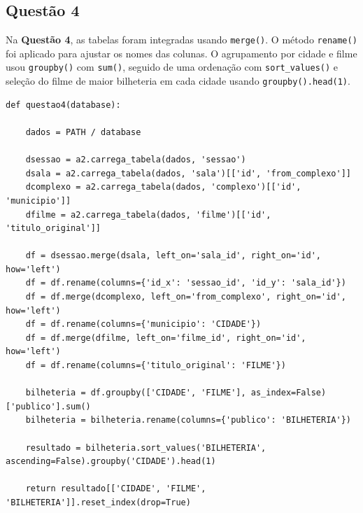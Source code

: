 \documentclass{article}
\begin{document}
\subsection*{Questão 4}
Na \textbf{Questão 4}, as tabelas foram integradas usando \texttt{merge()}. O método \texttt{rename()} foi aplicado para ajustar os nomes das colunas. O agrupamento por cidade e filme usou \texttt{groupby()} com \texttt{sum()}, seguido de uma ordenação com \texttt{sort\_values()} e seleção do filme de maior bilheteria em cada cidade usando \texttt{groupby().head(1)}.
\linespread{1}
\begin{lstlisting}
def questao4(database):

    dados = PATH / database
    
    dsessao = a2.carrega_tabela(dados, 'sessao')
    dsala = a2.carrega_tabela(dados, 'sala')[['id', 'from_complexo']]
    dcomplexo = a2.carrega_tabela(dados, 'complexo')[['id', 'municipio']]
    dfilme = a2.carrega_tabela(dados, 'filme')[['id', 'titulo_original']]

    df = dsessao.merge(dsala, left_on='sala_id', right_on='id', how='left')
    df = df.rename(columns={'id_x': 'sessao_id', 'id_y': 'sala_id'})  
    df = df.merge(dcomplexo, left_on='from_complexo', right_on='id', how='left')
    df = df.rename(columns={'municipio': 'CIDADE'})
    df = df.merge(dfilme, left_on='filme_id', right_on='id', how='left')
    df = df.rename(columns={'titulo_original': 'FILME'})

    bilheteria = df.groupby(['CIDADE', 'FILME'], as_index=False)['publico'].sum()
    bilheteria = bilheteria.rename(columns={'publico': 'BILHETERIA'})

    resultado = bilheteria.sort_values('BILHETERIA', ascending=False).groupby('CIDADE').head(1)

    return resultado[['CIDADE', 'FILME', 'BILHETERIA']].reset_index(drop=True)

\end{lstlisting}
\end{document}
